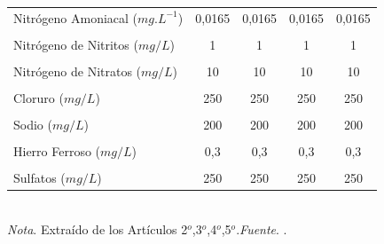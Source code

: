 \begin{table}[htpb]
\begin{tabular}{lcccc}
Nitrógeno Amoniacal ($mg.L^{-1}$)       & 0,0165    & 0,0165     & 0,0165     & 0,0165     \\
                                        &           &            &            &            \\
Nitrógeno de Nitritos ($mg/L$)          & 1         & 1          & 1          & 1          \\
                                        &           &            &            &            \\
Nitrógeno de Nitratos ($mg/L$)          & 10        & 10         & 10         & 10         \\
                                    &           &            &            &            \\ 
Cloruro ($mg /L$)                       & 250       & 250        & 250        & 250        \\
                                        &           &            &            &            \\
Sodio ($mg/L$)                          & 200       & 200        & 200        & 200        \\
                                        &           &            &            &            \\
Hierro Ferroso ($mg/L$)                 & 0,3       & 0,3        & 0,3        & 0,3        \\
                                        &           &            &            &            \\
Sulfatos ($mg/L$)                       & 250       & 250        & 250        & 250       \\
\bottomrule
\end{tabular}
\\
\bigskip
\small \textit{Nota}. Extra\'ido de los Art\'iculos 2$^{o}$,3$^{o}$,4$^{o}$,5$^{o}$.\textit{Fuente}. \cite{la-secretaria-del-ambiente-2002}.
\end{table}


